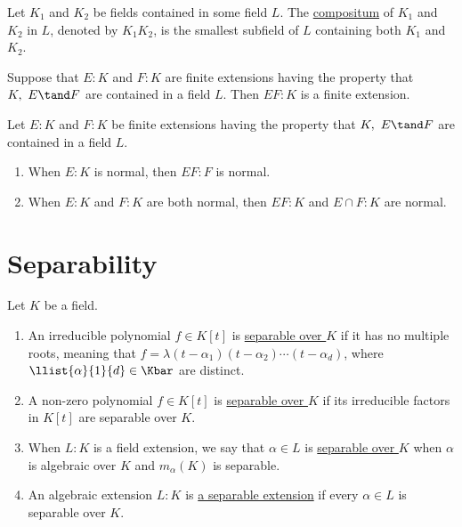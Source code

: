 \documentclass{article}
\begin{document}
  \begin{tdefinition}[Compositum]
    Let \( K_1 \) and \( K_2 \) be fields contained in some field \( L \).
    The \ul{compositum} of \( K_1 \) and \( K_2 \) in \( L \), denoted by \( K_1K_2 \), is the smallest subfield of \( L \) containing both \( K_1 \) and \( K_2 \).
  \end{tdefinition}

  \begin{tproposition}
    Suppose that \( E:K \) and \( F:K \) are finite extensions having the property that \( K,\ E\tand F \) are contained in a field \( L \).
    Then \( EF:K \) is a finite extension.
  \end{tproposition}

  \begin{ttheorem}
    Let \( E:K \) and \( F:K \) be finite extensions having the property that \( K,\ E\tand F \) are contained in a field \( L \).
    \begin{enumerate}[label=(\alph*)]
      \item When \( E:K \) is normal, then \( EF:F \) is normal.
      \item When \( E:K \) and \( F:K \) are both normal, then \( EF:K \) and \( E\cap F:K \) are normal.
    \end{enumerate}
  \end{ttheorem}


\section{Separability} %
\setcounter{tdefinition}{24}
  \begin{tdefinition}[Separable]
    Let \( K \) be a field.
    \begin{enumerate}[label=(\roman*)]
      \item An irreducible polynomial \( f\in K[t] \) is \ul{separable over \( K \)} if it has no multiple roots, meaning that \( f=\lambda(t-\alpha_1)(t-\alpha_2)\cdots(t-\alpha_d) \), where \( \llist{\alpha}{1}{d}\in \Kbar \) are distinct.
      \item A non-zero polynomial \( f\in K[t] \) is \ul{separable over \( K \)} if its irreducible factors in \( K[t] \) are separable over \( K \).
      \item When \( L:K \) is a field extension, we say that \( \alpha \in L \) is \ul{separable over \( K \)} when \( \alpha \) is algebraic over \( K \) and \( m_\alpha(K) \) is separable.
      \item An algebraic extension \( L:K \) is \ul{a separable extension} if every \( \alpha\in L \) is separable over \( K \).
    \end{enumerate}
  \end{tdefinition}
\end{document}
